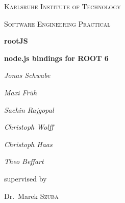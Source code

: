 \begin{titlepage}
	\centering
	{\scshape\LARGE Karlsruhe Institute of Technology \par}
	\vspace{1cm}
	{\scshape\Large Software Engineering Practical\par}
	\vspace{1.5cm}
	{\Huge\bfseries rootJS\par}
	\vspace{0.25cm}
	{\Large\bfseries node.js bindings for ROOT 6\par}
	\vspace{2cm}
	{\Large\itshape Jonas Schwabe\par}
	{\Large\itshape Maxi Fr\"uh\par}
	{\Large\itshape Sachin Rajgopal\par}
	{\Large\itshape Christoph Wolff\par}
	{\Large\itshape Christoph Haas\par}
	{\Large\itshape Theo Beffart\par}
	\vfill
	supervised by\par
	Dr.~Marek \textsc{Szuba}
	
	\vfill
	
	{\large \date{30.11.2015}\par}
\end{titlepage}
